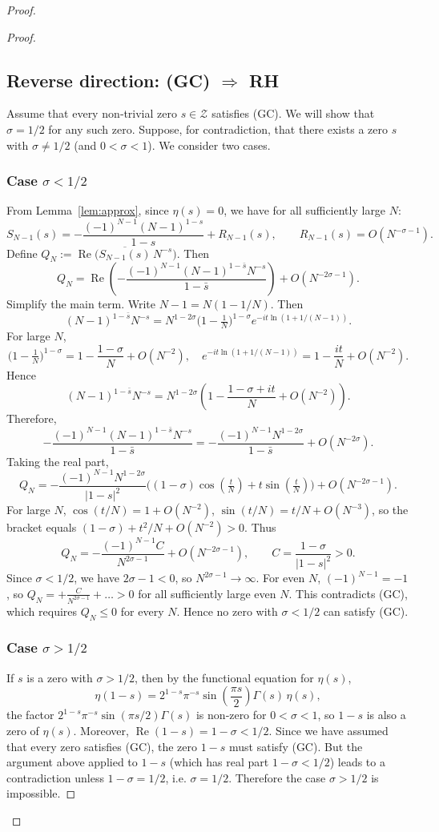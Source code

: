 \documentclass[12pt,a4paper]{article}
\begin{document}
\begin{proof}
\begin{proof}
\subsection{Reverse direction: (GC) \(\Rightarrow\) RH}

Assume that every non‑trivial zero \(s\in\mathcal{Z}\) satisfies (GC). We will show that \(\sigma=1/2\) for any such zero. Suppose, for contradiction, that there exists a zero \(s\) with \(\sigma\neq1/2\) (and \(0<\sigma<1\)). We consider two cases.

\subsubsection{Case \(\sigma<1/2\)}
From Lemma~\ref{lem:approx}, since \(\eta(s)=0\), we have for all sufficiently large \(N\):
\[
S_{N-1}(s)=-\frac{(-1)^{N-1}(N-1)^{1-s}}{1-s}+R_{N-1}(s),\qquad R_{N-1}(s)=O(N^{-\sigma-1}).
\]
Define \(Q_N:=\operatorname{Re}\bigl(\overline{S_{N-1}(s)}\,N^{-s}\bigr)\). Then
\[
Q_N = \operatorname{Re}\left(-\frac{(-1)^{N-1}(N-1)^{1-\bar s}N^{-s}}{1-\bar s}\right) + O(N^{-2\sigma-1}).
\]
Simplify the main term. Write \(N-1=N(1-1/N)\). Then
\[
(N-1)^{1-\bar s}N^{-s}=N^{1-2\sigma}\bigl(1-\tfrac1N\bigr)^{1-\sigma}e^{-it\ln(1+1/(N-1))}.
\]
For large \(N\),
\[
\bigl(1-\tfrac1N\bigr)^{1-\sigma}=1-\frac{1-\sigma}{N}+O(N^{-2}),\quad
e^{-it\ln(1+1/(N-1))}=1-\frac{it}{N}+O(N^{-2}).
\]
Hence
\[
(N-1)^{1-\bar s}N^{-s}=N^{1-2\sigma}\left(1-\frac{1-\sigma+it}{N}+O(N^{-2})\right).
\]
Therefore,
\[
-\frac{(-1)^{N-1}(N-1)^{1-\bar s}N^{-s}}{1-\bar s}
= -\frac{(-1)^{N-1}N^{1-2\sigma}}{1-\bar s} + O(N^{-2\sigma}).
\]
Taking the real part,
\[
Q_N = -\frac{(-1)^{N-1}N^{1-2\sigma}}{|1-s|^2}\bigl((1-\sigma)\cos(\tfrac{t}{N})+t\sin(\tfrac{t}{N})\bigr)+O(N^{-2\sigma-1}).
\]
For large \(N\), \(\cos(t/N)=1+O(N^{-2})\), \(\sin(t/N)=t/N+O(N^{-3})\), so the bracket equals \((1-\sigma)+t^2/N+O(N^{-2})>0\). Thus
\[
Q_N = -\frac{(-1)^{N-1}C}{N^{2\sigma-1}} + O(N^{-2\sigma-1}),\qquad C=\frac{1-\sigma}{|1-s|^2}>0.
\]
Since \(\sigma<1/2\), we have \(2\sigma-1<0\), so \(N^{2\sigma-1}\to\infty\). For even \(N\), \((-1)^{N-1}=-1\), so \(Q_N = +\frac{C}{N^{2\sigma-1}} + \dots >0\) for all sufficiently large even \(N\). This contradicts (GC), which requires \(Q_N\le0\) for every \(N\). Hence no zero with \(\sigma<1/2\) can satisfy (GC).

\subsubsection{Case \(\sigma>1/2\)}
If \(s\) is a zero with \(\sigma>1/2\), then by the functional equation for \(\eta(s)\),
\[
\eta(1-s)=2^{1-s}\pi^{-s}\sin\left(\frac{\pi s}{2}\right)\Gamma(s)\,\eta(s),
\]
the factor \(2^{1-s}\pi^{-s}\sin(\pi s/2)\Gamma(s)\) is non‑zero for \(0<\sigma<1\), so \(1-s\) is also a zero of \(\eta(s)\). Moreover, \(\operatorname{Re}(1-s)=1-\sigma<1/2\). Since we have assumed that every zero satisfies (GC), the zero \(1-s\) must satisfy (GC). But the argument above applied to \(1-s\) (which has real part \(1-\sigma<1/2\)) leads to a contradiction unless \(1-\sigma=1/2\), i.e. \(\sigma=1/2\). Therefore the case \(\sigma>1/2\) is impossible.


\end{proof}
\end{proof}
\end{document}
